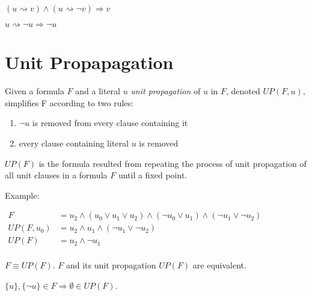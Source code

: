 \begin{myprop}
  $(u \rightsquigarrow v) \land (u \rightsquigarrow \neg v) \Rightarrow v$
\end{myprop}

\begin{myprop}[Contradiction]
  $u \rightsquigarrow \neg u \Rightarrow \neg u$
\end{myprop}


\section{Unit Propapagation}


\begin{mydef}
  Given a formula $F$ and a literal $u$ \emph{unit propagation}
  of $u$ in $F$, denoted $UP(F, u)$, simplifies F according to two rules:
  \begin{enumerate}
    \item $\neg u$ is removed from every clause containing it
    \item every clause containing literal $u$ is removed
  \end{enumerate}
\end{mydef}

\begin{mydef}
  $UP(F)$ is the formula resulted from repeating the process of unit propagation
  of all unit clauses in a formula $F$ until a fixed point.
\end{mydef}

Example:

$\begin{array}{rl}
  F & = u_2 \land (u_0 \lor u_1 \lor u_2) \land (\neg u_0 \lor u_1) \land (\neg u_1 \lor \neg u_2) \\
  UP(F, u_0) & = u_2 \land u_1 \land (\neg u_1 \lor \neg u_2) \\
  UP(F) & = u_2 \land \neg u_1 \\
\end{array}$


\begin{myprop}
  $F \equiv UP(F)$. $F$ and its unit propagation $UP(F)$ are equivalent.
\end{myprop}

\begin{myprop}
  $\{u\}, \{\neg u\} \in F \Rightarrow \emptyset \in UP(F)$.
\end{myprop}

